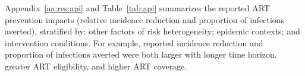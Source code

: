 \par
Appendix~\ref{aa:res:api} and Table~\ref{tab:api} summarizes
the reported ART prevention impacts (relative incidence reduction and proportion of infections averted),
stratified by: other factors of risk heterogeneity; epidemic contexts; and intervention conditions.
For example, reported incidence reduction and proportion of infections averted
were both larger with longer time horizon, greater ART eligibility, and higher ART coverage.